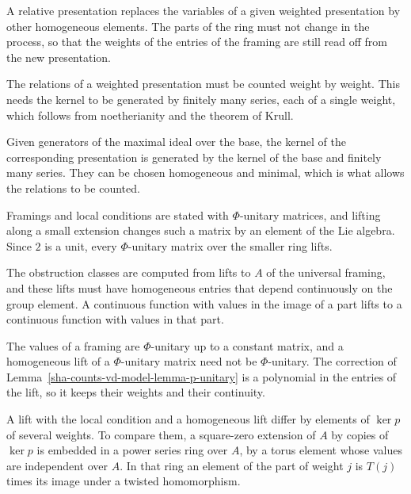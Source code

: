 A relative presentation replaces the variables of a given weighted presentation by other homogeneous elements. The parts of the ring must not change in the process, so that the weights of the entries of the framing are still read off from the new presentation.

The relations of a weighted presentation must be counted weight by weight. This needs the kernel to be generated by finitely many series, each of a single weight, which follows from noetherianity and the theorem of Krull.

Given generators of the maximal ideal over the base, the kernel of the corresponding presentation is generated by the kernel of the base and finitely many series. They can be chosen homogeneous and minimal, which is what allows the relations to be counted.

Framings and local conditions are stated with $\Phi$-unitary matrices, and lifting along a small extension changes such a matrix by an element of the Lie algebra. Since $2$ is a unit, every $\Phi$-unitary matrix over the smaller ring lifts.

The obstruction classes are computed from lifts to $A$ of the universal framing, and these lifts must have homogeneous entries that depend continuously on the group element. A continuous function with values in the image of a part lifts to a continuous function with values in that part.

The values of a framing are $\Phi$-unitary up to a constant matrix, and a homogeneous lift of a $\Phi$-unitary matrix need not be $\Phi$-unitary. The correction of Lemma~\ref{sha-counts-vd-model-lemma-p-unitary} is a polynomial in the entries of the lift, so it keeps their weights and their continuity.

A lift with the local condition and a homogeneous lift differ by elements of $\ker p$ of several weights. To compare them, a square-zero extension of $A$ by copies of $\ker p$ is embedded in a power series ring over $A$, by a torus element whose values are independent over $A$. In that ring an element of the part of weight $j$ is $T(j)$ times its image under a twisted homomorphism.

